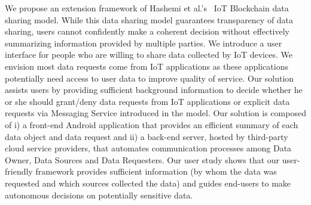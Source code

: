 We propose an extension framework of Hashemi et al.'s~\cite{campbell} IoT Blockchain data sharing model. While this data sharing model guarantees transparency of data sharing, users cannot confidently make a coherent decision without effectively summarizing information provided by multiple parties. We introduce a user interface for people who are willing to share data collected by IoT devices. We envision most data requests come from IoT applications as these applications potentially need access to user data to improve quality of service. Our solution assists users by providing sufficient background information to decide whether he or she should grant/deny data requests from IoT applications or explicit data requests via Messaging Service introduced in the model. Our solution is composed of i) a front-end Android application that provides an efficient summary of each data object and data request and ii) a back-end server, hosted by third-party cloud service providers, that automates communication processes among Data Owner, Data Sources and Data Requesters. Our user study shows that our user-friendly framework provides sufficient information (by whom the data was requested and which sources collected the data) and guides end-users to make autonomous decisions on potentially sensitive data.
